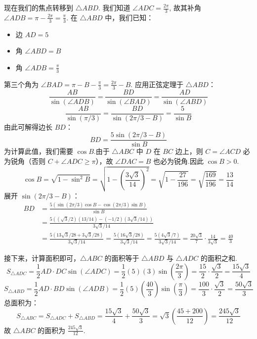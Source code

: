 \begin{prob-sol}
现在我们的焦点转移到 $\triangle ABD$.
我们知道 $\angle ADC = \frac{2\pi}{3}$, 故其补角 $\angle ADB = \pi - \frac{2\pi}{3} = \frac{\pi}{3}$.
在 $\triangle ABD$ 中，我们已知：
\begin{itemize}
	\item 边 $AD = 5$
	\item 角 $\angle ABD = B$
	\item 角 $\angle ADB = \frac{\pi}{3}$
\end{itemize}
第三个角为 $\angle BAD = \pi - B - \frac{\pi}{3} = \frac{2\pi}{3}-B$.
应用正弦定理于 $\triangle ABD$：
\[
\frac{AB}{\sin(\angle ADB)} = \frac{BD}{\sin(\angle BAD)} = \frac{AD}{\sin(\angle ABD)}
\]
\[
\frac{AB}{\sin(\pi/3)} = \frac{BD}{\sin(2\pi/3 - B)} = \frac{5}{\sin B}
\]
由此可解得边长 $BD$：
\[
BD = \frac{5\sin(2\pi/3 - B)}{\sin B}
\]
为计算此值，我们需要 $\cos B$.由于 $\triangle ABC$ 中 $D$ 在 $BC$ 边上，则 $C = \angle ACD$ 必为锐角（否则 $C+\angle ADC \ge \pi$），故 $\angle DAC = B$ 也必为锐角.因此 $\cos B > 0$.
\[
\cos B = \sqrt{1-\sin^2 B} = \sqrt{1 - \left(\frac{3\sqrt{3}}{14}\right)^2} = \sqrt{1-\frac{27}{196}} = \sqrt{\frac{169}{196}} = \frac{13}{14}
\]
展开 $\sin(2\pi/3 - B)$：
\begin{align*}
	BD &= \frac{5(\sin(2\pi/3)\cos B - \cos(2\pi/3)\sin B)}{\sin B} \\
	&= \frac{5((\sqrt{3}/2)(13/14) - (-1/2)(3\sqrt{3}/14))}{3\sqrt{3}/14} \\
	&= \frac{5(13\sqrt{3}/28 + 3\sqrt{3}/28)}{3\sqrt{3}/14} = \frac{5(16\sqrt{3}/28)}{3\sqrt{3}/14} = \frac{5(4\sqrt{3}/7)}{3\sqrt{3}/14} = \frac{20\sqrt{3}}{7} \cdot \frac{14}{3\sqrt{3}} = \frac{40}{3}
\end{align*}

接下来，计算面积即可，$\triangle ABC$ 的面积等于 $\triangle ABD$ 与 $\triangle ADC$ 的面积之和.
\[
S_{\triangle ADC} = \frac{1}{2}AD \cdot DC \sin(\angle ADC) = \frac{1}{2}(5)(3)\sin\left(\frac{2\pi}{3}\right) = \frac{15}{2} \cdot \frac{\sqrt{3}}{2} = \frac{15\sqrt{3}}{4}
\]
\[
S_{\triangle ABD} = \frac{1}{2}AD \cdot BD \sin(\angle ADB) = \frac{1}{2}(5)\left(\frac{40}{3}\right)\sin\left(\frac{\pi}{3}\right) = \frac{100}{3} \cdot \frac{\sqrt{3}}{2} = \frac{50\sqrt{3}}{3}
\]
总面积为：
\[
S_{\triangle ABC} = S_{\triangle ADC} + S_{\triangle ABD} = \frac{15\sqrt{3}}{4} + \frac{50\sqrt{3}}{3} = \sqrt{3}\left(\frac{45+200}{12}\right) = \frac{245\sqrt{3}}{12}
\]
	故 $\triangle ABC$ 的面积为 $\frac{245\sqrt{3}}{12}$.\hfill\qedsymbol
\end{prob-sol}
